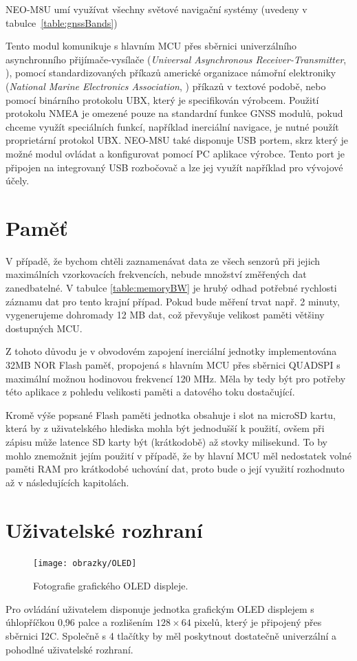 NEO-M8U umí využívat všechny světové navigační systémy (uvedeny v tabulce~\ref{table:gnssBands})

Tento modul komunikuje s hlavním \ac{MCU} přes sběrnici univerzálního asynchronního přijímače-vysílače (\emph{Universal Asynchronous Receiver-Transmitter}, ), pomocí standardizovaných příkazů americké organizace
námořní elektroniky (\emph{National Marine Electronics Association}, ) příkazů v textové podobě, nebo pomocí binárního protokolu \ac{UBX}, který je specifikován výrobcem. Použití protokolu \ac{NMEA} je omezené pouze na standardní funkce \ac{GNSS} modulů, pokud chceme využít speciálních funkcí, například inerciální navigace, je nutné použít proprietární protokol \ac{UBX}. \cite{DLQg9bT6V1GWKhxh} NEO-M8U také disponuje \ac{USB} portem, skrz který je možné modul ovládat a konfigurovat pomocí PC aplikace výrobce. Tento port je připojen na integrovaný \ac{USB} rozbočovač a lze jej využít například pro vývojové účely.

\section{Paměť}

V případě, že bychom chtěli zaznamenávat data ze všech senzorů při jejich maximálních vzorkovacích frekvencích, nebude množství změřených dat zanedbatelné. V tabulce \ref{table:memoryBW} je hrubý odhad potřebné rychlosti záznamu dat pro tento krajní případ. Pokud bude měření trvat např. 2 minuty, vygenerujeme dohromady 12 MB dat, což převyšuje velikost paměti většiny dostupných \ac{MCU}.

Z tohoto důvodu je v obvodovém zapojení inerciální jednotky implementována 32MB NOR Flash paměť, propojená s hlavním \ac{MCU} přes sběrnici QUADSPI s maximální možnou hodinovou frekvencí 120 MHz. Měla by tedy být pro potřeby této aplikace z pohledu velikosti paměti a datového toku dostačující. \cite{CgaRYSTpwKhEZZr7}

Kromě výše popsané Flash paměti jednotka obsahuje i slot na microSD kartu, která by z uživatelského hlediska mohla být jednodušší k použití, ovšem při zápisu může latence SD karty být (krátkodobě) až stovky milisekund. \cite{Kraewinkel2020} To by mohlo znemožnit jejím použití v případě, že by hlavní \ac{MCU} měl nedostatek volné paměti RAM pro krátkodobé uchování dat, proto bude o její využití rozhodnuto až v následujících kapitolách.

\section{Uživatelské rozhraní}
\begin{figure}[h]
    \centering
    \texttt{[image: obrazky/OLED]}
    \caption{Fotografie grafického OLED displeje.}
\end{figure}
Pro ovládání uživatelem disponuje jednotka grafickým \ac{OLED} displejem s úhlopříčkou 0,96 palce a rozlišením $ 128 \times 64 $ pixelů, který je připojený přes sběrnici \ac{I2C}. Společně s 4 tlačítky by měl poskytnout dostatečně univerzální a pohodlné uživatelské rozhraní.

